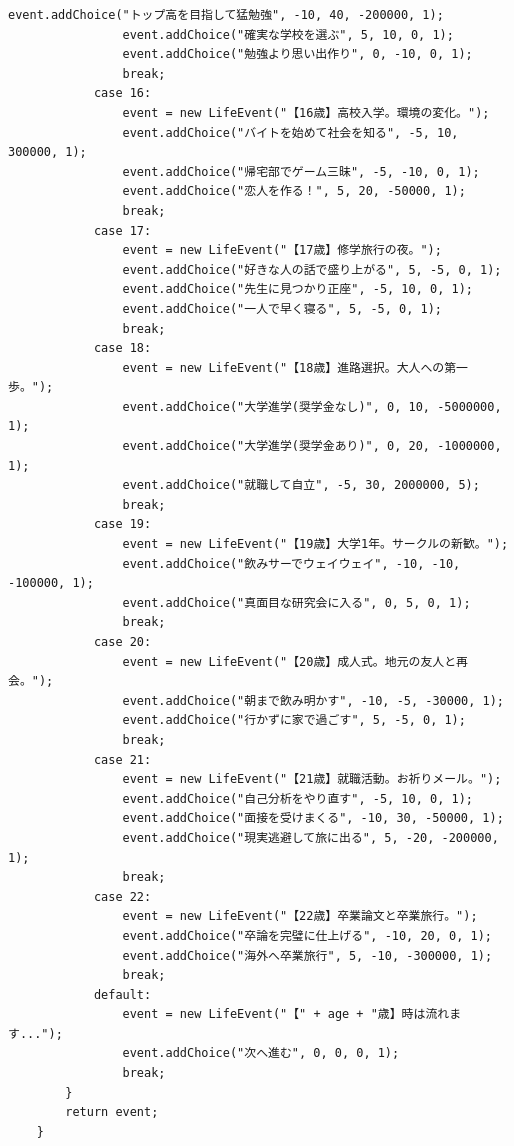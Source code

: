 \documentclass[a4paper,11pt]{jsarticle}
\begin{document}
\begin{lstlisting}[caption=GameLogic.java]
                event.addChoice("トップ高を目指して猛勉強", -10, 40, -200000, 1);
                event.addChoice("確実な学校を選ぶ", 5, 10, 0, 1);
                event.addChoice("勉強より思い出作り", 0, -10, 0, 1);
                break;
            case 16:
                event = new LifeEvent("【16歳】高校入学。環境の変化。");
                event.addChoice("バイトを始めて社会を知る", -5, 10, 300000, 1);
                event.addChoice("帰宅部でゲーム三昧", -5, -10, 0, 1);
                event.addChoice("恋人を作る！", 5, 20, -50000, 1);
                break;
            case 17:
                event = new LifeEvent("【17歳】修学旅行の夜。");
                event.addChoice("好きな人の話で盛り上がる", 5, -5, 0, 1);
                event.addChoice("先生に見つかり正座", -5, 10, 0, 1);
                event.addChoice("一人で早く寝る", 5, -5, 0, 1);
                break;
            case 18:
                event = new LifeEvent("【18歳】進路選択。大人への第一歩。");
                event.addChoice("大学進学(奨学金なし)", 0, 10, -5000000, 1);
                event.addChoice("大学進学(奨学金あり)", 0, 20, -1000000, 1);
                event.addChoice("就職して自立", -5, 30, 2000000, 5);
                break;
            case 19:
                event = new LifeEvent("【19歳】大学1年。サークルの新歓。");
                event.addChoice("飲みサーでウェイウェイ", -10, -10, -100000, 1);
                event.addChoice("真面目な研究会に入る", 0, 5, 0, 1);
                break;
            case 20:
                event = new LifeEvent("【20歳】成人式。地元の友人と再会。");
                event.addChoice("朝まで飲み明かす", -10, -5, -30000, 1);
                event.addChoice("行かずに家で過ごす", 5, -5, 0, 1);
                break;
            case 21:
                event = new LifeEvent("【21歳】就職活動。お祈りメール。");
                event.addChoice("自己分析をやり直す", -5, 10, 0, 1);
                event.addChoice("面接を受けまくる", -10, 30, -50000, 1);
                event.addChoice("現実逃避して旅に出る", 5, -20, -200000, 1);
                break;
            case 22:
                event = new LifeEvent("【22歳】卒業論文と卒業旅行。");
                event.addChoice("卒論を完璧に仕上げる", -10, 20, 0, 1);
                event.addChoice("海外へ卒業旅行", 5, -10, -300000, 1);
                break;
            default:
                event = new LifeEvent("【" + age + "歳】時は流れます...");
                event.addChoice("次へ進む", 0, 0, 0, 1);
                break;
        }
        return event;
    }


\end{lstlisting}
\end{document}
